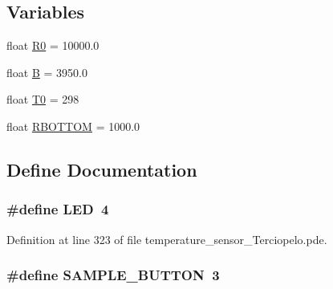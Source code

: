 \subsection*{Variables}
\begin{CompactItemize}
\item 
float \hyperlink{temperature__sensor___terciopelo_8pde_735577560ca40e5b6008a98829068904}{R0} = 10000.0
\item 
float \hyperlink{temperature__sensor___terciopelo_8pde_8188fea1f6709096fe21a3ee084d00d0}{B} = 3950.0
\item 
float \hyperlink{temperature__sensor___terciopelo_8pde_4211ba1269f650e21964d32238a460b2}{T0} = 298
\item 
float \hyperlink{temperature__sensor___terciopelo_8pde_d17df5990b551ac9e97a3d60f65833ff}{RBOTTOM} = 1000.0
\end{CompactItemize}


\subsection{Define Documentation}
\hypertarget{temperature__sensor___terciopelo_8pde_eb7a7ba1ab7e0406f1b5ab36d579f585}{
\subsubsection[{LED}]{\setlength{\rightskip}{0pt plus 5cm}\#define LED~4}}
\label{temperature__sensor___terciopelo_8pde_eb7a7ba1ab7e0406f1b5ab36d579f585}




Definition at line 323 of file temperature\_\-sensor\_\-Terciopelo.pde.\hypertarget{temperature__sensor___terciopelo_8pde_b2de299215608c2a35f0feb86adc2f6f}{
\subsubsection[{SAMPLE\_\-BUTTON}]{\setlength{\rightskip}{0pt plus 5cm}\#define SAMPLE\_\-BUTTON~3}}
\label{temperature__sensor___terciopelo_8pde_b2de299215608c2a35f0feb86adc2f6f}




